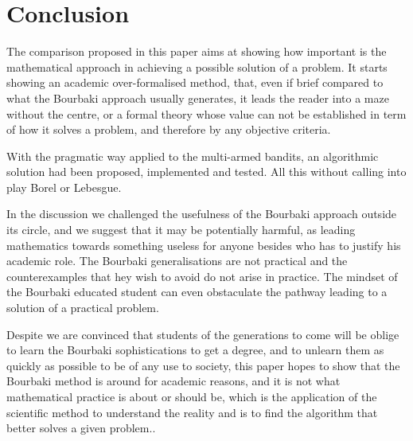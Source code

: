 \documentclass[]{scrartcl}
\theoremstyle{definition}
\begin{document}
\section{Conclusion}

The comparison proposed in this paper aims at showing how important is the mathematical approach in achieving a possible solution of a problem. It starts showing an academic over-formalised method, that, even if brief compared to what the Bourbaki approach usually generates, it leads the reader into a maze without the centre, or a formal theory whose value can not be established in term of how it solves a problem, and therefore by any objective criteria.

With the pragmatic way applied to the multi-armed bandits, an algorithmic solution had been proposed, implemented and tested. All this without calling into play Borel or Lebesgue.

In the discussion we challenged the usefulness of the Bourbaki approach outside its circle, and we suggest that it may be potentially harmful, as leading mathematics towards something useless for anyone besides who has to justify his academic role. The Bourbaki generalisations are not practical and the counterexamples that hey wish to avoid do not arise in practice. The mindset of the Bourbaki educated student can even obstaculate the pathway leading to a solution of a practical problem.

Despite we are convinced that students of the generations to come will be oblige to learn the Bourbaki sophistications to get a degree, and to unlearn them as quickly as possible to be of any use to society, this paper hopes to show that the Bourbaki method is around for academic reasons, and it is not what mathematical practice is about or should be, which is the application of the scientific method to understand the reality and is to find the algorithm that better solves a given problem..


 

\end{document}
